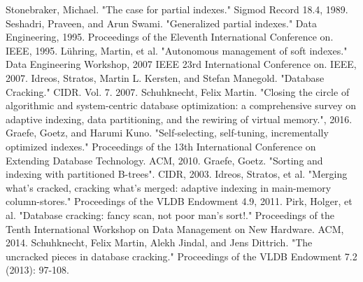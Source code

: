 \documentclass[10pt, conference, compsocconf]{IEEEtran}
\begin{document}
\begin{thebibliography}{8}

Stonebraker, Michael. "The case for partial indexes." Sigmod Record 18.4, 1989.
Seshadri, Praveen, and Arun Swami. "Generalized partial indexes." Data Engineering, 1995. Proceedings of the Eleventh International Conference on. IEEE, 1995.
L\"uhring, Martin, et al. "Autonomous management of soft indexes." Data Engineering Workshop, 2007 IEEE 23rd International Conference on. IEEE, 2007.
Idreos, Stratos, Martin L. Kersten, and Stefan Manegold. "Database Cracking." CIDR. Vol. 7. 2007.
Schuhknecht, Felix Martin. "Closing the circle of algorithmic and system-centric database optimization: a comprehensive survey on adaptive indexing, data partitioning, and the rewiring of virtual memory.", 2016.
Graefe, Goetz, and Harumi Kuno. "Self-selecting, self-tuning, incrementally optimized indexes." Proceedings of the 13th International Conference on Extending Database Technology. ACM, 2010.
Graefe, Goetz. "Sorting and indexing with partitioned B-trees". CIDR, 2003.
Idreos, Stratos, et al. "Merging what's cracked, cracking what's merged: adaptive indexing in main-memory column-stores." Proceedings of the VLDB Endowment 4.9, 2011.
Pirk, Holger, et al. "Database cracking: fancy scan, not poor man's sort!." Proceedings of the Tenth International Workshop on Data Management on New Hardware. ACM, 2014.
Schuhknecht, Felix Martin, Alekh Jindal, and Jens Dittrich. "The uncracked pieces in database cracking." Proceedings of the VLDB Endowment 7.2 (2013): 97-108.

\end{thebibliography}
\end{document}
